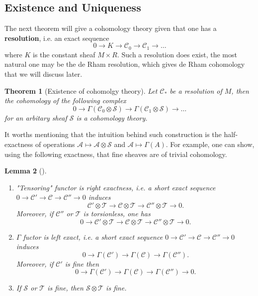 \documentclass[11pt]{article}
\newtheorem{theorem}{Theorem}
\newtheorem{lemma}[theorem]{Lemma}
\begin{document}
\subsection{Existence and Uniqueness}
\label{sec:org65911e0}
The next theorem will give a cohomology theory given that one has a \textbf{resolution}, i.e. an
exact sequence 
\[
0 \longrightarrow K \longrightarrow \mathcal{C}_0 \longrightarrow
\mathcal{C}_1 \longrightarrow \dots 
\] 
where \(K\) is the constant sheaf \(M\times R\). Such a resolution does exist, the most
natural one may be the de Rham resolution, which gives de Rham cohomology that we will
discuss later. 

\begin{theorem}[Existence of cohomolgy theory]
\label{thm:existence-cohomology}
Let \(\mathcal{C}_*\) be a resolution of \(M\), then the cohomology of the following
complex
\[
0 \longrightarrow \Gamma(\mathcal{C}_0 \otimes \mathcal{S}) \longrightarrow
\Gamma(\mathcal{C}_1 \otimes \mathcal{S}) \longrightarrow \dots
\]
for an arbitary sheaf \(\mathcal{S}\) is a cohomology theory.
\end{theorem}

It worths mentioning that the intuition behind such construction is the half-exactness of
operations \(\mathcal{A} \mapsto \mathcal{A}\otimes \mathcal{S}\) and \(\mathcal{A}\mapsto \Gamma(A)\). For example, one can show, using the following exactness,
that fine sheaves are of trivial cohomology.

\begin{lemma}[]
\label{lem:exactness}
\begin{enumerate}
\item "Tensoring" functor is right exactness, i.e. a short exact sequence \(0 \longrightarrow
   \mathcal{C}' \longrightarrow \mathcal{C} \longrightarrow \mathcal{C}'' \longrightarrow
   0\) induces
\[
   \mathcal{C}'\otimes \mathcal{T} \longrightarrow \mathcal{C}\otimes \mathcal{T}
   \longrightarrow \mathcal{C}''\otimes \mathcal{T} \longrightarrow 0.
   \]
Moreover, if \(\mathcal{C}''\) or \(\mathcal{T}\) is torsionless, one has
\[
   0 \longrightarrow \mathcal{C}'\otimes \mathcal{T} \longrightarrow \mathcal{C}\otimes \mathcal{T}
   \longrightarrow \mathcal{C}''\otimes \mathcal{T} \longrightarrow 0.
   \]
\item \(\Gamma\) fuctor is left exact, i.e. a short exact sequence \(0 \longrightarrow
   \mathcal{C}' \longrightarrow \mathcal{C} \longrightarrow \mathcal{C}'' \longrightarrow
   0\) induces
\[
   0 \longrightarrow \Gamma(\mathcal{C}') \longrightarrow \Gamma(\mathcal{C}) \longrightarrow \Gamma(\mathcal{C}'').
   \]
Moreover, if \(\mathcal{C}'\) is fine then
\[
   0 \longrightarrow \Gamma(\mathcal{C}') \longrightarrow \Gamma(\mathcal{C})
   \longrightarrow \Gamma(\mathcal{C}'') \longrightarrow 0.
   \]
\item If \(\mathcal{S}\) or \(\mathcal{T}\) is fine, then \(\mathcal{S}\otimes
   \mathcal{T}\) is fine.
\end{enumerate}
\end{lemma}
\end{document}
